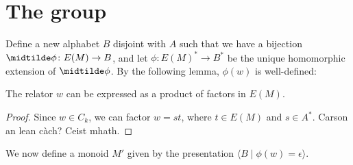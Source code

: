 \documentclass[libertine,widepage,nosubthm]{lmaths}
\begin{document}
\section{The group}
Define a new alphabet $B$ disjoint with $A$ such that we have a bijection $\midtilde\phi \colon E(M) \to B$, and let $\phi \colon E(M)^* \to B^*$ be the unique homomorphic extension of $\midtilde\phi$. By the following lemma, $\phi(w)$ is well-defined:

\begin{lemma}
	The relator $w$ can be expressed as a product of factors in $E(M)$.
\end{lemma}
\begin{proof}
	Since $w \in C_k$, we can factor $w = st$, where $t \in E(M)$ and $s \in A^*$. Carson an lean càch? Ceist mhath.
\end{proof}

We now define a monoid $M'$ given by the presentation $\langle B \mid \phi(w) = \epsilon \rangle$.


\printbibliography
\end{document}
